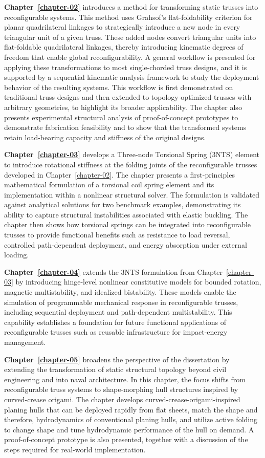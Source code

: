 \textbf{Chapter~\ref{chapter-02}} introduces a method for transforming static trusses into reconfigurable systems. This method uses Grahsof's flat-foldability criterion for planar quadrilateral linkages to strategically introduce a new node in every triangular unit of a given truss. These added nodes convert triangular units into flat-foldable quadrilateral linkages, thereby introducing kinematic degrees of freedom that enable global reconfigurability. A general workflow is presented for applying these transformations to most single-chorded truss designs, and it is supported by a sequential kinematic analysis framework to study the deployment behavior of the resulting systems. This workflow is first demonstrated on traditional truss designs and then extended to topology-optimized trusses with arbitrary geometries, to highlight its broader applicability. The chapter also presents experimental structural analysis of proof-of-concept prototypes to demonstrate fabrication feasibility and to show that the transformed systems retain load-bearing capacity and stiffness of the original designs.

\textbf{Chapter~\ref{chapter-03}} develops a Three-node Torsional Spring (3NTS) element to introduce rotational stiffness at the folding joints of the reconfigurable trusses developed in Chapter~\ref{chapter-02}. The chapter presents a first-principles mathematical formulation of a torsional coil spring element and its implementation within a nonlinear structural solver. The formulation is validated against analytical solutions for two benchmark examples, demonstrating its ability to capture structural instabilities associated with elastic buckling. The chapter then shows how torsional springs can be integrated into reconfigurable trusses to provide functional benefits such as resistance to load reversal, controlled path-dependent deployment, and energy absorption under external loading.

\textbf{Chapter~\ref{chapter-04}} extends the 3NTS formulation from Chapter~\ref{chapter-03} by introducing hinge-level nonlinear constitutive models for bounded rotation, magnetic multistability, and idealized bistability. These models enable the simulation of programmable mechanical response in reconfigurable trusses, including sequential deployment and path-dependent multistability. This capability establishes a foundation for future functional applications of reconfigurable trusses such as reusable infrastructure for impact-energy management.

\textbf{Chapter~\ref{chapter-05}} broadens the perspective of the dissertation by extending the transformation of static structural topology beyond civil engineering and into naval architecture. In this chapter, the focus shifts from reconfigurable truss systems to shape-morphing hull structures inspired by curved-crease origami. The chapter develops curved-crease-origami-inspired planing hulls that can be deployed rapidly from flat sheets, match the shape and therefore, hydrodynamics of conventional planing hulls, and utilize active folding to change shape and tune hydrodynamic performance of the hull on demand. A proof-of-concept prototype is also presented, together with a discussion of the steps required for real-world implementation.

